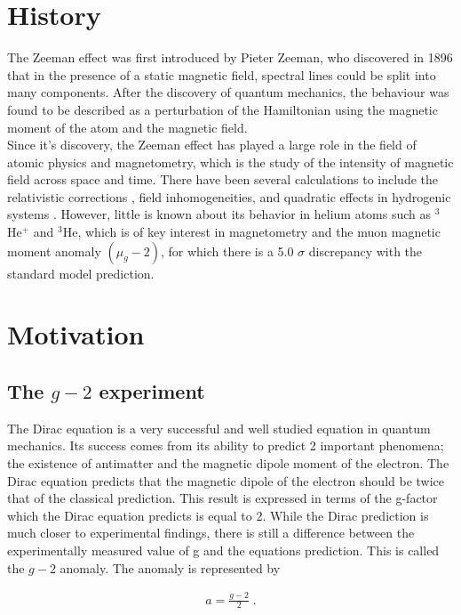     \section{History}\label{sec:history}
        The Zeeman effect was first introduced by Pieter Zeeman, who discovered in 1896 that in the presence of a static magnetic field, spectral lines could be split into many components. After the discovery of quantum mechanics, the behaviour was found to be described as a perturbation of the Hamiltonian using the magnetic moment of the atom and the magnetic field.   \\
    
        Since it's discovery, the Zeeman effect has played a large role in the field of atomic physics and magnetometry, which is the study of the intensity of magnetic field across space and time. There have been several calculations to include the relativistic corrections \cite{2007Drake-Wu, Drake-Yan}, field inhomogeneities, and quadratic effects in hydrogenic systems \cite{Fontanari_Sadovskií_2015}. However, little is known about its behavior in helium atoms such as $^3$He$^+$ and $^3$He, which is of key interest in magnetometry and the muon magnetic moment anomaly $(\mu_g - 2)$, for which there is a 5.0 $\sigma$ discrepancy \cite{aguillard2023measurement} with the standard model prediction.

    \section{Motivation}\label{sec:motivation}
        \subsection{The $g-2$ experiment}\label{sec:g-2}
        The Dirac equation is a very successful and well studied equation in quantum mechanics. Its success comes from its ability to predict 2 important phenomena; the existence of antimatter and the magnetic dipole moment of the electron. The Dirac equation predicts that the magnetic dipole of the electron should be twice that of the classical prediction. This result is expressed in terms of the g-factor which the Dirac equation predicts is equal to 2. While the Dirac prediction is much closer to experimental findings, there is still a difference between the experimentally measured value of g and the equations prediction. This is called the $g-2$ anomaly. The anomaly is represented by

        \begin{align}
            a = \frac{g - 2}{2}\;.
        \end{align}


